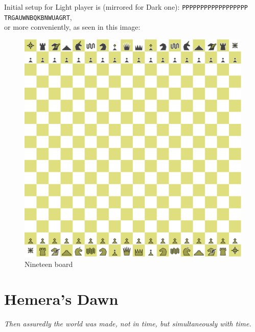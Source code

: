 \documentclass[a5paper,12pt,draft]{book} %
\begin{document}
Initial setup for Light player is (mirrored for Dark one):
\texttt{PPPPPPPPPPPPPPPPPP \\
        TRGAUWNBQKBNWUAGRT}, \\
or more conveniently, as seen in this image:

\noindent
\begin{figure}[h]
\includegraphics[width=1.0\textwidth, keepaspectratio=true]{../gfx/boards/12_nineteen.png}
\caption{Nineteen board}
\label{fig:nineteen}
\end{figure}

\clearpage

\chapter*{Hemera's Dawn}

\begin{flushright}
\parbox{0.8\textwidth}{
\emph{Then assuredly the world was made, not in time, but simultaneously with time. \\
 } }
\end{flushright}
\end{document}
